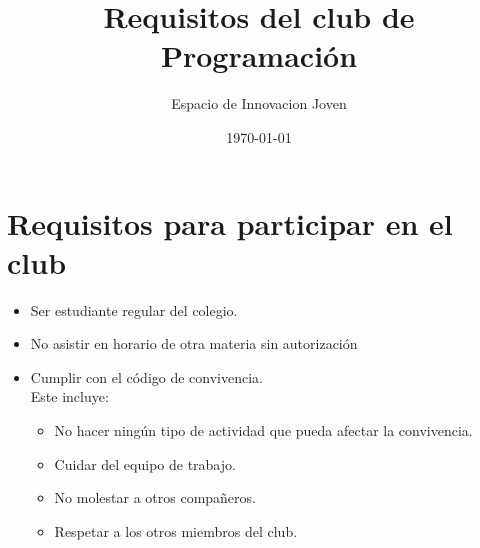 \documentclass{article}
\title{Requisitos del club de Programación}
\date{\today}
\author{Espacio de Innovacion Joven}
\begin{document}
\maketitle
\thispagestyle{fancy}
\section{Requisitos para participar en el club}
\begin{itemize}
	\item Ser estudiante regular del colegio.
	\item No asistir en horario de otra materia sin autorización
	\item Cumplir con el código de convivencia.\\
	      Este incluye:
	      \begin{itemize}
		      \item No hacer ningún tipo de actividad que pueda afectar la convivencia.
		      \item Cuidar del equipo de trabajo.
		      \item No molestar a otros compañeros.
		      \item Respetar a los otros miembros del club.
	      \end{itemize}
\end{itemize}
\end{document}
